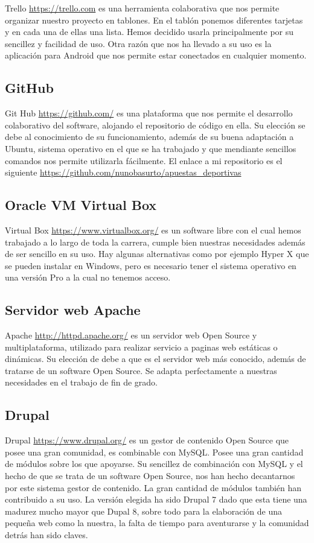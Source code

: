 Trello \url{https://trello.com} es una herramienta colaborativa que nos permite organizar nuestro  proyecto en tablones. En el tablón ponemos diferentes tarjetas y en cada una de ellas una lista.
Hemos decidido usarla principalmente por su sencillez y facilidad de uso. Otra razón que nos ha llevado a su uso es la aplicación para Android que nos permite estar  conectados en cualquier momento.

\subsection{GitHub}
Git Hub \url{https://github.com/} es una plataforma que nos permite el desarrollo colaborativo del software, alojando el repositorio de código en ella.
Su elección se debe al conocimiento de su funcionamiento, además de su buena adaptación a Ubuntu, sistema operativo en el que se ha trabajado y que mendiante sencillos comandos nos permite utilizarla fácilmente. El enlace a mi repositorio es el siguiente \url{https://github.com/nunobasurto/apuestas_deportivas}

\subsection{Oracle VM Virtual Box}
Virtual Box \url{https://www.virtualbox.org/} es un software libre con el cual hemos trabajado a lo largo de toda la carrera, cumple bien nuestras necesidades además de ser sencillo en su uso. Hay algunas alternativas como por ejemplo Hyper X que se pueden instalar en Windows, pero es necesario tener el sistema operativo en una versión Pro a la cual no tenemos acceso.

\subsection{Servidor web Apache}
Apache \url{http://httpd.apache.org/} es un servidor web Open Source y multiplataforma, utilizado para realizar servicio a paginas web estáticas o dinámicas.
Su elección de debe a que es el servidor web más conocido, además de tratarse de un software Open Source. Se adapta perfectamente a nuestras necesidades en el trabajo de fin de grado.


\subsection{Drupal}
Drupal \url{https://www.drupal.org/} es un gestor de contenido Open Source que posee una gran comunidad, es combinable con MySQL. Posee una gran cantidad de módulos sobre los que apoyarse.
Su sencillez de combinación con MySQL y el hecho de que se trata de un software Open Source, nos han hecho decantarnos por este sistema gestor de contenido. La gran cantidad de módulos también han contribuido a su uso.
La versión elegida ha sido Drupal 7 dado que esta tiene una madurez mucho mayor que Dupal 8, sobre todo para la elaboración de una pequeña web como la nuestra, la falta de tiempo para aventurarse y la comunidad detrás han sido claves.

